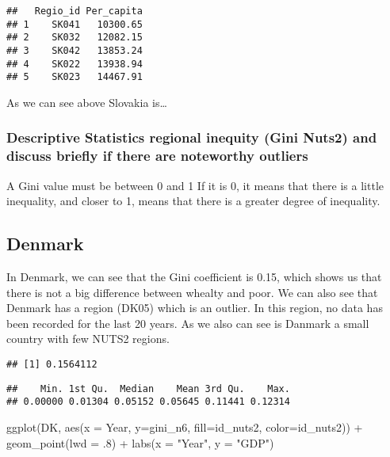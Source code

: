 \documentclass[
]{article}
\newenvironment{Shaded}{\begin{snugshade}}{\end{snugshade}}
\newcommand{\AttributeTok}[1]{\textcolor[rgb]{0.77,0.63,0.00}{#1}}
\newcommand{\DecValTok}[1]{\textcolor[rgb]{0.00,0.00,0.81}{#1}}
\newcommand{\FunctionTok}[1]{\textcolor[rgb]{0.00,0.00,0.00}{#1}}
\newcommand{\NormalTok}[1]{#1}
\newcommand{\SpecialCharTok}[1]{\textcolor[rgb]{0.00,0.00,0.00}{#1}}
\newcommand{\StringTok}[1]{\textcolor[rgb]{0.31,0.60,0.02}{#1}}
\begin{document}
\begin{verbatim}
##   Regio_id Per_capita
## 1    SK041   10300.65
## 2    SK032   12082.15
## 3    SK042   13853.24
## 4    SK022   13938.94
## 5    SK023   14467.91
\end{verbatim}

As we can see above Slovakia is\ldots{}

\hypertarget{descriptive-statistics-regional-inequity-gini-nuts2-and-discuss-briefly-if-there-are-noteworthy-outliers}{%
\subsubsection{Descriptive Statistics regional inequity (Gini Nuts2) and
discuss briefly if there are noteworthy
outliers}\label{descriptive-statistics-regional-inequity-gini-nuts2-and-discuss-briefly-if-there-are-noteworthy-outliers}}

A Gini value must be between 0 and 1 If it is 0, it means that there is
a little inequality, and closer to 1, means that there is a greater
degree of inequality.

\hypertarget{denmark}{%
\subsection{Denmark}\label{denmark}}

In Denmark, we can see that the Gini coefficient is 0.15, which shows us
that there is not a big difference between whealty and poor. We can also
see that Denmark has a region (DK05) which is an outlier. In this
region, no data has been recorded for the last 20 years. As we also can
see is Danmark a small country with few NUTS2 regions.

\begin{verbatim}
## [1] 0.1564112
\end{verbatim}

\begin{verbatim}
##    Min. 1st Qu.  Median    Mean 3rd Qu.    Max. 
## 0.00000 0.01304 0.05152 0.05645 0.11441 0.12314
\end{verbatim}

\begin{Shaded}
\begin{Highlighting}[]
  \FunctionTok{ggplot}\NormalTok{(DK, }\FunctionTok{aes}\NormalTok{(}\AttributeTok{x =}\NormalTok{ Year, }\AttributeTok{y=}\NormalTok{gini\_n6, }\AttributeTok{fill=}\NormalTok{id\_nuts2, }\AttributeTok{color=}\NormalTok{id\_nuts2)) }\SpecialCharTok{+}
  \FunctionTok{geom\_point}\NormalTok{(}\AttributeTok{lwd =}\NormalTok{ .}\DecValTok{8}\NormalTok{) }\SpecialCharTok{+}
   \FunctionTok{labs}\NormalTok{(}\AttributeTok{x =} \StringTok{"Year"}\NormalTok{, }\AttributeTok{y =} \StringTok{"GDP"}\NormalTok{)}
\end{Highlighting}
\end{Shaded}
\end{document}
